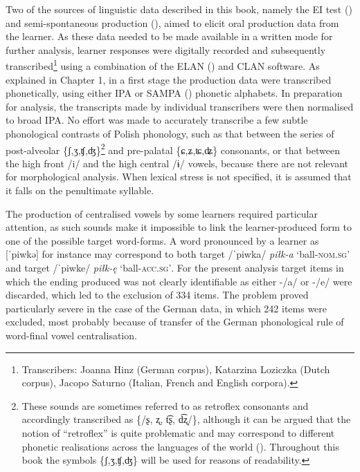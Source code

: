 Two of the sources of linguistic data described in this book, namely the EI test () and semi-spontaneous production (), aimed to elicit oral production data from the learner. As these data needed to be made available in a written mode for further analysis, learner responses were digitally recorded and subsequently transcribed\footnote{Transcribers: Joanna Hinz (German corpus), Katarzina Loziczka (Dutch corpus), Jacopo Saturno (Italian, French and English corpora).} using a combination of the ELAN (\citealt{BrugmanRussell2004}) and CLAN \citep{MacWhinney2000} software. As explained in Chapter 1, in a first stage the production data were transcribed phonetically, using either IPA \citep{LandauEtAl1999} or SAMPA (\citealt{Wells1995, Wells1997}) phonetic alphabets. In preparation for analysis, the transcripts made by individual transcribers were then normalised to broad IPA. No effort was made to accurately transcribe a few subtle phonological contrasts of Polish phonology, such as that between the series of post-alveolar \{ʃ,ʒ,ʧ,ʤ\}\footnote{These sounds are sometimes referred to as retroflex consonants and accordingly transcribed as \{/ʂ, ʐ, t͡ʂ, d͡ʐ/\}, although it can be argued that the notion of ``retroflex'' is quite problematic and may correspond to different phonetic realisations across the languages of the world (\citealt{Hamann2002, Hamann2003, Hamann2004, Żygis2003, ŻygisHamann2003, PadgettŻygis2007, ŻygisPadgett2010}). Throughout this book the symbols \{ʃ,ʒ,ʧ,ʤ\} will be used for reasons of readability.} and pre-palatal \{ɕ,ʑ,ʨ,ʥ\} consonants, or that between the high front /i/ and the high central /ɨ/ vowels, because there are not relevant for morphological analysis. When lexical stress is not specified, it is assumed that it falls on the penultimate syllable.

The production of centralised vowels by some learners required particular attention, as such sounds make it impossible to link the learner-produced form to one of the possible target word-forms. A word pronounced by a learner as [ˈpiwkə] for instance may correspond to both target /ˈpiwka/ \textit{piłk-a} ‘ball-\textsc{nom.sg}’ and target /ˈpiwke/ \textit{piłk-ę} ‘ball-\textsc{acc.sg’}. For the present analysis target items in which the ending produced was not clearly identifiable as either -/a/ or -/e/ were discarded, which led to the exclusion of 334 items. The problem proved particularly severe in the case of the German data, in which 242 items were excluded, most probably because of transfer of the German phonological rule of word-final vowel centralisation. 


